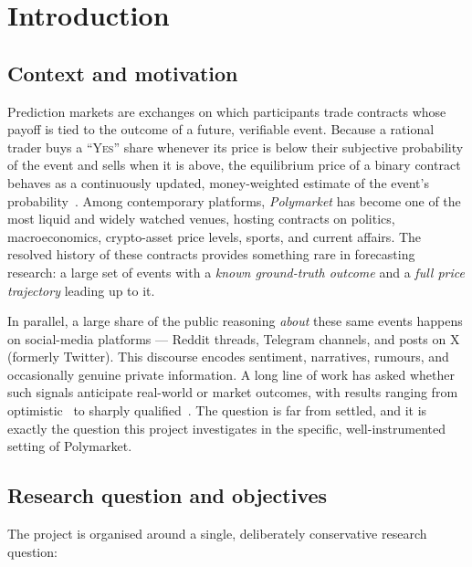 
\chapter{Introduction}
\label{ch:intro}

\section{Context and motivation}
Prediction markets are exchanges on which participants trade contracts whose
payoff is tied to the outcome of a future, verifiable event. Because a rational
trader buys a ``\textsc{Yes}'' share whenever its price is below their subjective
probability of the event and sells when it is above, the equilibrium price of a
binary contract behaves as a continuously updated, money-weighted estimate of the
event's probability~\cite{wolfers2004prediction,berg2008prediction}. Among
contemporary platforms, \emph{Polymarket} has become one of the most liquid and
widely watched venues, hosting contracts on politics, macroeconomics, crypto-asset
price levels, sports, and current affairs. The resolved history of these contracts
provides something rare in forecasting research: a large set of events with a
\emph{known ground-truth outcome} and a \emph{full price trajectory} leading up to
it.

In parallel, a large share of the public reasoning \emph{about} these same events
happens on social-media platforms --- Reddit threads, Telegram channels, and posts
on X (formerly Twitter). This discourse encodes sentiment, narratives, rumours, and
occasionally genuine private information. A long line of work has asked whether such
signals anticipate real-world or market outcomes, with results ranging from
optimistic~\cite{bollen2011twitter,salathe2012assessing} to sharply
qualified~\cite{tetlock2007giving}. The question is far from settled, and it is
exactly the question this project investigates in the specific, well-instrumented
setting of Polymarket.

\section{Research question and objectives}
The project is organised around a single, deliberately conservative research
question:

